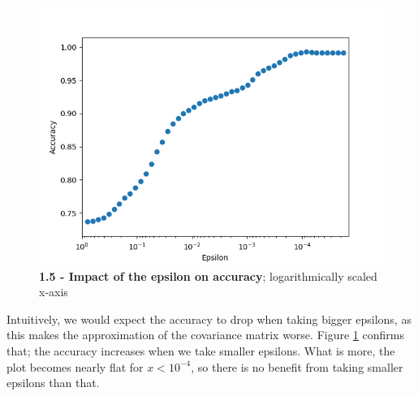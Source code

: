 \documentclass[12pt]{article}
\begin{document}
\begin{figure}
\centering
\includegraphics[scale=1]{task1_4c_epsilons_accuracy.png}
\caption{\textbf{1.5 - Impact of the epsilon on accuracy}; logarithmically scaled x-axis}
\label{epsilon_analysis}
\end{figure}

Intuitively, we would expect the accuracy to drop when taking bigger epsilons, as this makes the approximation of the covariance matrix worse. Figure \ref{epsilon_analysis} confirms that; the accuracy increases when we take smaller epsilons. What is more, the plot becomes nearly flat for $x<10^{-4}$, so there is no benefit from taking smaller epsilons than that.
\end{document}
